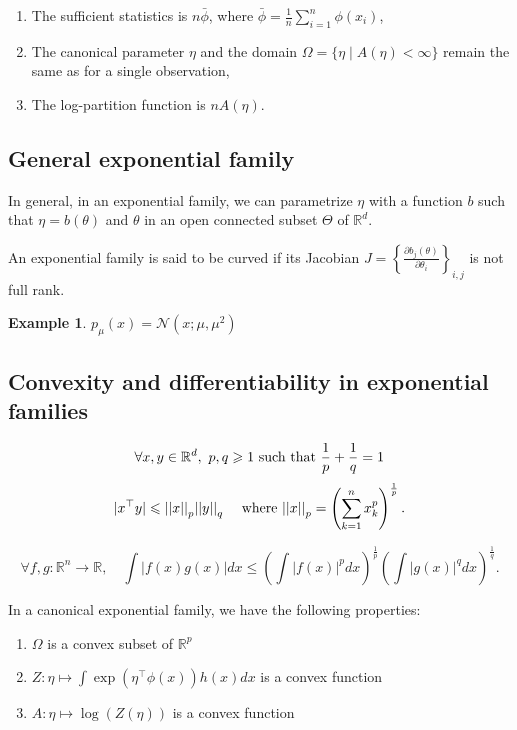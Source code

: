 \documentclass[12pt]{report}
\newtheorem{example}{Example}[section]
\begin{document}
\begin{enumerate}
  \item The sufficient statistics is $n\bar{\phi}$, where $\bar{\phi}=\frac{1}{n} \sum_{i=1}^{n}\phi(x_i)$,
  \item The canonical parameter $\eta$ and the domain $\Omega = \{\eta \mid A(\eta) < \infty\}$ remain the same as for a single observation,
  \item The log-partition function is $nA(\eta)$.
\end{enumerate}

\subsection{General exponential family}
In general, in an exponential family, we can parametrize $\eta$ with a function $b$ such that  $\eta = b(\theta)$ and $\theta$ in an open connected subset $\Theta$ of $\mathbb{R}^d$.


\begin{definition}
An exponential family is said to be curved if its Jacobian $J=\left\lbrace \frac{\partial b_j(\theta)}{\partial \theta_i} \right\rbrace_{i,j}$ is not full rank.
\end{definition}

\begin{example}
$p_\mu(x) = \mathcal{N}(x; \mu , \mu^2)$
\end{example}


\subsection{Convexity and differentiability in exponential families}

\begin{lemma} 
$$\forall x, y \in \mathbb{R}^d,  \ p, q \geqslant 1 \ \textnormal{such that} \ \frac{1}{p} + \frac{1}{q} = 1$$
\[ |x^\top y| \leqslant {||x||}_p {||y||}_q \quad \textnormal{ where } {||x||}_p = \left(\sum_{k = 1}^n x_k^p\right)^\frac1p. \]

$$\forall f, g: \mathbb{R}^n \rightarrow  \mathbb{R}, \quad
 \int |f(x) g(x)| dx \leqslant \left(\int |f(x)|^p dx\right)^\frac1p \left(\int |g(x)|^q dx\right)^\frac1q. $$
\end{lemma}

\begin{theorem}[Convexity]
In a canonical exponential family, we have the following properties:
\begin{enumerate}
\item $\Omega$ is a convex subset of $ \mathbb{R}^p$
\item $Z: \eta\mapsto \int \exp \left(\eta^\top \phi(x) \right) h(x) dx$ is a convex function
\item $A: \eta \mapsto \log \left(Z(\eta) \right)$ is a convex function
\end{enumerate}
\end{theorem}
\end{document}
